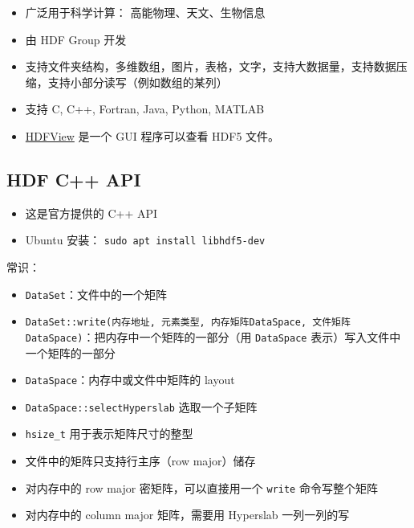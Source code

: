 

\begin{issues}
\issueDraft
\end{issues}

\begin{itemize}
\item 广泛用于科学计算： 高能物理、天文、生物信息
\item 由 HDF Group 开发
\item 支持文件夹结构，多维数组，图片，表格，文字，支持大数据量，支持数据压缩，支持小部分读写（例如数组的某列）
\item 支持 C, C++, Fortran, Java, Python, MATLAB
\item \href{https://www.hdfgroup.org/downloads/hdfview/}{HDFView} 是一个 GUI 程序可以查看 HDF5 文件。
\end{itemize}

\subsection{HDF C++ API}
\begin{itemize}
\item 这是官方提供的 C++ API
\item Ubuntu 安装： \verb|sudo apt install libhdf5-dev|
\end{itemize}

常识：
\begin{itemize}
\item \verb|DataSet|：文件中的一个矩阵
\item \verb|DataSet::write(内存地址, 元素类型, 内存矩阵DataSpace, 文件矩阵DataSpace)|：把内存中一个矩阵的一部分（用 \verb`DataSpace` 表示）写入文件中一个矩阵的一部分
\item \verb|DataSpace|：内存中或文件中矩阵的 layout
\item \verb|DataSpace::selectHyperslab| 选取一个子矩阵
\item \verb`hsize_t` 用于表示矩阵尺寸的整型
\item 文件中的矩阵只支持行主序（row major）储存
\item 对内存中的 row major 密矩阵，可以直接用一个 \verb`write` 命令写整个矩阵
\item 对内存中的 column major 矩阵，需要用 Hyperslab 一列一列的写
\end{itemize}


